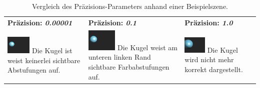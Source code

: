 \begin{table}[H]
    \centering
    \caption{Vergleich des Präzisions-Parameters anhand einer Beispielszene.}\label{table:sphere_tracing_precision}
    \begin{tabular}{p{}p{}p{}}
        \toprule
            \textbf{Präzision: \textit{0.00001}} &
            \textbf{Präzision: \textit{0.1}}     &
            \textbf{Präzision: \textit{1.0}}     \\
        \cmidrule(r){1-1}\cmidrule(lr){2-2}\cmidrule(l){3-3}
            \includegraphics[width=0.3\textwidth]{img/sphere_tracing_precision_full.png} \newline
            Die Kugel ist weist keinerlei sichtbare Abstufungen auf. &
            \includegraphics[width=0.3\textwidth]{img/sphere_tracing_precision_min.png} \newline
            Die Kugel weist am unteren linken Rand sichtbare Farbabstufungen auf. &
            \includegraphics[width=0.3\textwidth]{img/sphere_tracing_precision_pos.png} \newline
            Die Kugel wird nicht mehr korrekt dargestellt. \\
        \bottomrule
    \end{tabular}
\end{table}

